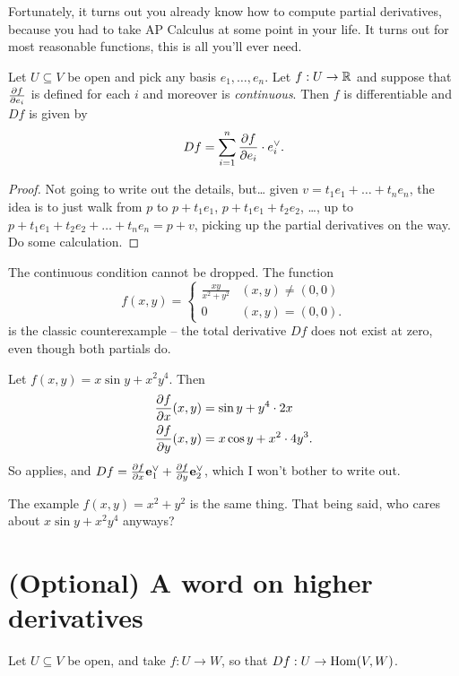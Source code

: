 Fortunately, it turns out you already know how to compute partial derivatives,
because you had to take AP Calculus at some point in your life.
It turns out for most reasonable functions, this is all you'll ever need.
\begin{theorem}
	\label{thm:apcalc_partials}
	Let $U \subseteq V$ be open and pick any basis $e_1, \dots, e_n$.
	Let $f : U \to \mathbb R$ and suppose that $\frac{\partial f}{\partial e_i}$ is defined
	for each $i$ and moreover is \emph{continuous}.
	Then $f$ is differentiable and $Df$ is given by
	\[ Df = \sum_{i=1}^n \frac{\partial f}{\partial e_i} \cdot e_i^\vee. \]
\end{theorem}
\begin{proof}
	Not going to write out the details, but\dots
	given $v = t_1e_1 + \dots + t_ne_n$,
	the idea is to just walk from $p$ to $p+t_1e_1$, $p+t_1e_1+t_2e_2$, \dots,
	up to $p+t_1e_1+t_2e_2+\dots+t_ne_n = p+v$,
	picking up the partial derivatives on the way.
	Do some calculation.
\end{proof}

\begin{remark}
	The continuous condition cannot be dropped. The function
	\[
		f(x,y)
		= \begin{cases}
			\frac{xy}{x^2+y^2} & (x,y) \neq (0,0) \\
			0 & (x,y) = (0,0).
		\end{cases}
	\]
	is the classic counterexample -- the total derivative $Df$ does not exist at zero,
	even though both partials do.
\end{remark}

\begin{example}
	Let $f(x,y) = x \sin y + x^2y^4$. Then
	\begin{align*}
		\frac{\partial f}{\partial x} (x,y) &= \sin y + y^4 \cdot 2x \\
		\frac{\partial f}{\partial y} (x,y) &= x \cos y + x^2 \cdot 4y^3.
	\end{align*}
	So  applies,
	and $Df = \frac{\partial f}{\partial x} \mathbf e_1^\vee + \frac{\partial f}{\partial y} \mathbf e_2^\vee$,
	which I won't bother to write out.
\end{example}

The example $f(x,y) = x^2+y^2$ is the same thing.
That being said, who cares about $x \sin y + x^2y^4$ anyways?

\section{(Optional) A word on higher derivatives}
Let $U \subseteq V$ be open, and take $f : U \to W$, so that $Df : U \to \operatorname{Hom}(V,W)$.

